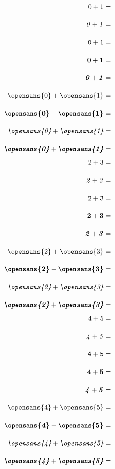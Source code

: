 \documentclass[letterpaper,12pt]{article}
\begin{document}
\begin{multicols}{5}
\noindent
\begin{align*}
    \mathrm{0+1}&=\\[1em]
    \mathit{0+1}&=\\[1em]
    \mathtt{0+1}&=\\[1em]
    \mathbf{0+1}&=\\[1em]
    \textbf{\textit{0}}+\textbf{\textit{1}}&=\\[1em]
    \textrm{\opensans{0}}+\textrm{\opensans{1}}&=\\[1em]
    \textbf{\opensans{0}}+\textbf{\opensans{1}}&=\\[1em]
    \textit{\opensans{0}}+\textit{\opensans{1}}&=\\[1em]
    \textbf{\textit{\opensans{0}}}+\textbf{\textit{\opensans{1}}}&=\\
\end{align*}
\begin{align*}
    \mathrm{2+3}&=\\[1em]
    \mathit{2+3}&=\\[1em]
    \mathtt{2+3}&=\\[1em]
    \mathbf{2+3}&=\\[1em]
    \textbf{\textit{2}}+\textbf{\textit{3}}&=\\[1em]
    \textrm{\opensans{2}}+\textrm{\opensans{3}}&=\\[1em]
    \textbf{\opensans{2}}+\textbf{\opensans{3}}&=\\[1em]
    \textit{\opensans{2}}+\textit{\opensans{3}}&=\\[1em]
    \textbf{\textit{\opensans{2}}}+\textbf{\textit{\opensans{3}}}&=\\
\end{align*}
\begin{align*}
    \mathrm{4+5}&=\\[1em]
    \mathit{4+5}&=\\[1em]
    \mathtt{4+5}&=\\[1em]
    \mathbf{4+5}&=\\[1em]
    \textbf{\textit{4}}+\textbf{\textit{5}}&=\\[1em]
    \textrm{\opensans{4}}+\textrm{\opensans{5}}&=\\[1em]
    \textbf{\opensans{4}}+\textbf{\opensans{5}}&=\\[1em]
    \textit{\opensans{4}}+\textit{\opensans{5}}&=\\[1em]
    \textbf{\textit{\opensans{4}}}+\textbf{\textit{\opensans{5}}}&=\\

\end{align*}
\end{multicols}
\end{document}

